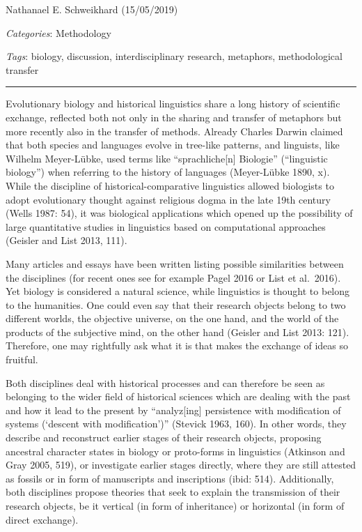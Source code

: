 \documentclass[
  a4paper,
  14pt,
  oneside,
  tablecaptionabove
]{scrbook}
\begin{document}
Nathanael E. Schweikhard  (15/05/2019)

\emph{Categories}: Methodology

\emph{Tags}: biology, discussion, interdisciplinary research, metaphors,
methodological transfer

\begin{center}\rule{0.5\linewidth}{1pt}\end{center}


Evolutionary biology and historical linguistics share a long history of
scientific exchange, reflected both not only in the sharing and transfer
of metaphors but more recently also in the transfer of methods. Already
Charles Darwin claimed that both species and languages evolve in
tree-like patterns, and linguists, like Wilhelm Meyer-Lübke, used terms
like \enquote{sprachliche{[}n{]} Biologie} (\enquote{linguistic
biology}) when referring to the history of languages (Meyer-Lübke 1890,
x). While the discipline of historical-comparative linguistics allowed
biologists to adopt evolutionary thought against religious dogma in the
late 19th century (Wells 1987: 54), it was biological applications which
opened up the possibility of large quantitative studies in linguistics
based on computational approaches (Geisler and List 2013, 111).

Many articles and essays have been written listing possible similarities
between the disciplines (for recent ones see for example Pagel 2016 or
List et al.~2016). Yet biology is considered a natural science, while
linguistics is thought to belong to the humanities. One could even say
that their research objects belong to two different worlds, the
objective universe, on the one hand, and the world of the products of
the subjective mind, on the other hand (Geisler and List 2013: 121).
Therefore, one may rightfully ask what it is that makes the exchange of
ideas so fruitful.

Both disciplines deal with historical processes and can therefore be
seen as belonging to the wider field of historical sciences which are
dealing with the past and how it lead to the present by
\enquote{analyz{[}ing{]} persistence with modification of systems
(\enquote{descent with modification})} (Stevick 1963, 160). In other
words, they describe and reconstruct earlier stages of their research
objects, proposing ancestral character states in biology or proto-forms
in linguistics (Atkinson and Gray 2005, 519), or investigate earlier
stages directly, where they are still attested as fossils or in form of
manuscripts and inscriptions (ibid: 514). Additionally, both disciplines
propose theories that seek to explain the transmission of their research
objects, be it vertical (in form of inheritance) or horizontal (in form
of direct exchange).
\end{document}
